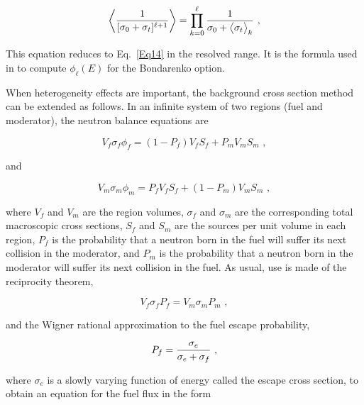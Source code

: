   \begin{equation}
    \biggl<{{1}\over{[\sigma_0+\sigma_t]^{\ell+1}}}\biggr>
    = \prod_{k=0}^{\ell}{1\over{\sigma_0+\bigl<\sigma_t\bigr>_k}}\,\,,
  \label{Eq22}
  \end{equation}
\vspace{0.5 pt}

\noindent
This equation reduces to Eq.~\ref{Eq14} in the resolved range.  It is
the formula used in  to compute $\phi_{\ell}(E)$ for the
Bondarenko option.

When heterogeneity effects are important, the
background cross section method can be extended as follows.  In an
infinite system of two regions (fuel and moderator), the neutron
balance equations are

  \begin{equation}
    V_f\sigma_f\phi_f=(1-P_f)V_f S_f+P_m V_m S_m\,\,,
  \end{equation}

\noindent
and

  \begin{equation}
    V_m\sigma_m\phi_m=P_f V_f S_f+(1-P_m)V_m S_m\,\,,
  \end{equation}

\noindent
where $V_f$ and $V_m$ are the region volumes, $\sigma_f$ and $\sigma_m$
are the corresponding total macroscopic cross sections, $S_f$ and $S_m$
are the sources per unit volume in each region, $P_f$ is the probability
that a neutron born in the fuel will suffer its next collision in the
moderator, and $P_m$ is the probability that a neutron born in the
moderator will suffer its next collision in the fuel.  As usual, use
is made of the reciprocity theorem,

  \begin{equation}
    V_f\sigma_f P_f=V_m\sigma_m P_m \,\,,
  \end{equation}

\noindent
and the Wigner rational approximation
to the fuel escape probability,

  \begin{equation}
    P_f={{\sigma_e}\over{\sigma_e+\sigma_f}}\,\,,
  \end{equation}

\noindent
where $\sigma_e$ is a slowly varying function of energy called the escape
cross section, to obtain an equation for the
fuel flux in the form

